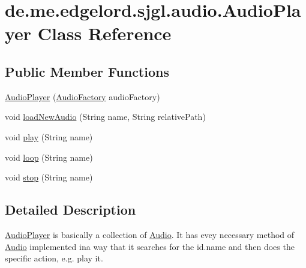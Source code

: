 \hypertarget{classde_1_1me_1_1edgelord_1_1sjgl_1_1audio_1_1_audio_player}{}\section{de.\+me.\+edgelord.\+sjgl.\+audio.\+Audio\+Player Class Reference}
\label{classde_1_1me_1_1edgelord_1_1sjgl_1_1audio_1_1_audio_player}
\subsection*{Public Member Functions}
\begin{DoxyCompactItemize}
\item 
\mbox{\hyperlink{classde_1_1me_1_1edgelord_1_1sjgl_1_1audio_1_1_audio_player_aa2ce9d41080a96a25e09f9b0830e7b04}{Audio\+Player}} (\mbox{\hyperlink{classde_1_1me_1_1edgelord_1_1sjgl_1_1factory_1_1_audio_factory}{Audio\+Factory}} audio\+Factory)
\item 
void \mbox{\hyperlink{classde_1_1me_1_1edgelord_1_1sjgl_1_1audio_1_1_audio_player_a3fa42a34769a40aaf94c16e1589f7b09}{load\+New\+Audio}} (String name, String relative\+Path)
\item 
void \mbox{\hyperlink{classde_1_1me_1_1edgelord_1_1sjgl_1_1audio_1_1_audio_player_aecce0a524758259586949e7fb0c477d6}{play}} (String name)
\item 
void \mbox{\hyperlink{classde_1_1me_1_1edgelord_1_1sjgl_1_1audio_1_1_audio_player_a4773c3bc2054fcb5f7892ebf330c68b8}{loop}} (String name)
\item 
void \mbox{\hyperlink{classde_1_1me_1_1edgelord_1_1sjgl_1_1audio_1_1_audio_player_a52bd650d815c823dc0a5e99b4aeba927}{stop}} (String name)
\end{DoxyCompactItemize}


\subsection{Detailed Description}
{\ttfamily \mbox{\hyperlink{classde_1_1me_1_1edgelord_1_1sjgl_1_1audio_1_1_audio_player}{Audio\+Player}}} is basically a collection of {\ttfamily \mbox{\hyperlink{classde_1_1me_1_1edgelord_1_1sjgl_1_1audio_1_1_audio}{Audio}}}. It has evey necessary method of {\ttfamily \mbox{\hyperlink{classde_1_1me_1_1edgelord_1_1sjgl_1_1audio_1_1_audio}{Audio}}} implemented ina way that it searches for the id.\+name and then does the specific action, e.\+g. play it. 

